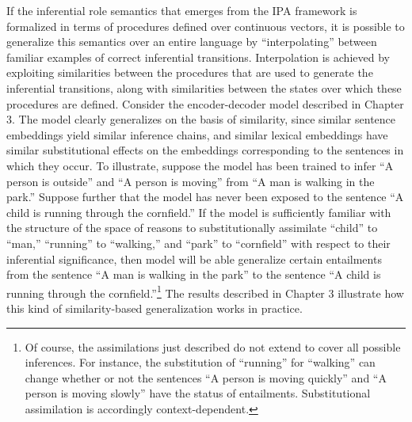 If the inferential role semantics that emerges from the IPA framework is formalized in terms of procedures defined over continuous vectors, it is possible to generalize this semantics over an entire language by ``interpolating'' between familiar examples of correct inferential transitions. Interpolation is achieved by exploiting similarities between the procedures that are used to generate the inferential transitions, along with similarities between the states over which these procedures are defined. Consider the encoder-decoder model described in Chapter 3. The model clearly generalizes on the basis of similarity, since similar sentence embeddings yield similar inference chains, and similar lexical embeddings have similar substitutional effects on the embeddings corresponding to the sentences in which they occur. To illustrate, suppose the model has been trained to infer ``A person is outside'' and ``A person is moving'' from ``A man is walking in the park.'' Suppose further that the model has never been exposed to the sentence ``A child is running through the cornfield.'' If the model is sufficiently familiar with the structure of the space of reasons to substitutionally assimilate ``child'' to ``man,'' ``running'' to ``walking,'' and ``park'' to ``cornfield'' with respect to their inferential significance, then model will be able generalize certain entailments from the sentence ``A man is walking in the park'' to the sentence ``A child is running through the cornfield.''\footnote{Of course, the assimilations just described do not extend to cover all possible inferences. For instance, the substitution of ``running'' for ``walking'' can change whether or not the sentences ``A person is moving quickly'' and ``A person is moving slowly'' have the status of entailments. Substitutional assimilation is accordingly context-dependent.} The results described in Chapter 3 illustrate how this kind of similarity-based generalization works in practice.

